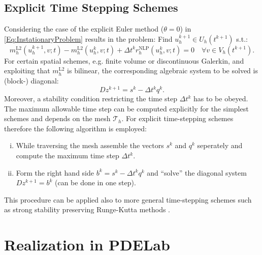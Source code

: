 \documentclass[a4paper,12pt]{article}
\begin{document}
\subsection*{Explicit Time Stepping Schemes}

Considering the case of the explicit Euler method ($\theta=0$) in \eqref{Eq:InstationaryProblem}
results in the problem: Find $u_h^{k+1}\in U_h(t^{k+1})$ s.t.:
\begin{equation*}
 m_h^\text{L2}(u_h^{k+1},v;t)-m_h^\text{L2}(u_h^{k},v;t) +
\Delta t^k r_h^\text{NLP}(u_h^{k},v;t) = 0
\quad \forall v\in V_h(t^{k+1}).
\end{equation*}
For certain spatial schemes, e.g. finite volume or discontinuous Galerkin,
and exploiting that $m_h^\text{L2}$ is bilinear, the corresponding algebraic system
to be solved is (block-) diagonal:
\begin{equation}
Dz^{k+1} = s^k - \Delta t^k q^k.
\end{equation}
Moreover, a stability condition restricting the time step $\Delta t^k$
has to be obeyed. The maximum allowable time step can be computed
explicitly for the simplest schemes and depends on the mesh $\mathcal{T}_h$.
For explicit time-stepping schemes therefore the following algorithm is employed:
\begin{enumerate}[i)]
\item While traversing the mesh assemble the vectors $s^k$ and
$q^k$ seperately and compute the maximum time step $\Delta t^k$.
\item Form the right hand side $b^k=s^k - \Delta t^k q^k$ and ``solve'' the
diagonal system $Dz^{k+1} = b^k$ (can be done in one step).
\end{enumerate}
This procedure can be applied also to more general time-stepping schemes
such as strong stability preserving Runge-Kutta methods \cite{shu:88}.

\section{Realization in PDELab}
\end{document}
